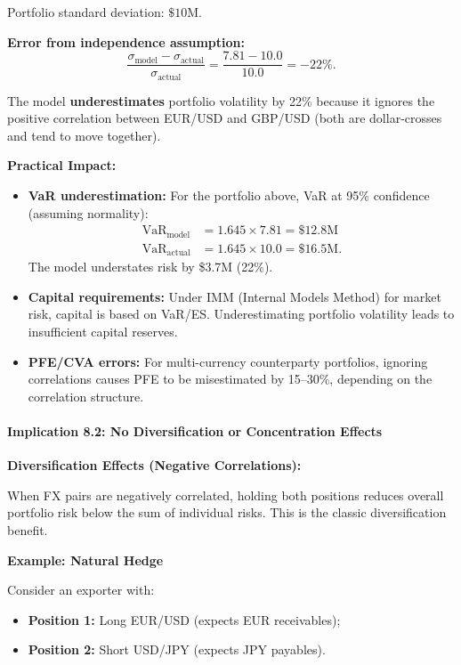 Portfolio standard deviation: $\$10$M.

\textbf{Error from independence assumption:}
\begin{equation}
	\frac{\sigma_{\text{model}} - \sigma_{\text{actual}}}{\sigma_{\text{actual}}} = \frac{7.81 - 10.0}{10.0} = -22\%.
\end{equation}

The model \textbf{underestimates} portfolio volatility by 22\% because it ignores the positive correlation between EUR/USD and GBP/USD (both are dollar-crosses and tend to move together).

\textbf{Practical Impact:}

\begin{itemize}
	\item \textbf{VaR underestimation:} For the portfolio above, VaR at 95\% confidence (assuming normality):
	\begin{align}
		\text{VaR}_{\text{model}} &= 1.645 \times 7.81 = \$12.8\text{M} \\
		\text{VaR}_{\text{actual}} &= 1.645 \times 10.0 = \$16.5\text{M}.
	\end{align}
	The model understates risk by \$3.7M (22\%).
	
	\item \textbf{Capital requirements:} Under IMM (Internal Models Method) for market risk, capital is based on VaR/ES. Underestimating portfolio volatility leads to insufficient capital reserves.
	
	\item \textbf{PFE/CVA errors:} For multi-currency counterparty portfolios, ignoring correlations causes PFE to be misestimated by 15--30\%, depending on the correlation structure.
\end{itemize}

\paragraph{Implication 8.2: No Diversification or Concentration Effects}

\textbf{Diversification Effects (Negative Correlations):}

When FX pairs are negatively correlated, holding both positions reduces overall portfolio risk below the sum of individual risks. This is the classic diversification benefit.

\textbf{Example: Natural Hedge}

Consider an exporter with:
\begin{itemize}
	\item \textbf{Position 1:} Long EUR/USD (expects EUR receivables);
	\item \textbf{Position 2:} Short USD/JPY (expects JPY payables).
\end{itemize}

